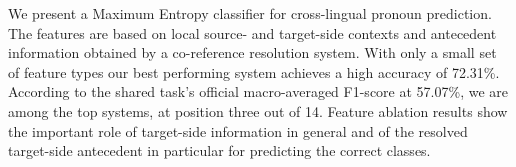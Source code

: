 We present a Maximum Entropy classifier for cross-lingual pronoun prediction. The features are based on local source- and target-side contexts and antecedent information obtained by a co-reference resolution system. With only a small set of feature types our best performing system achieves a high accuracy of 72.31\%. According to the shared task's official macro-averaged F1-score at 57.07\%, we are among the top systems, at position three out of 14. Feature ablation results show the important role of target-side information in general and of the resolved target-side antecedent in particular for predicting the correct classes.
